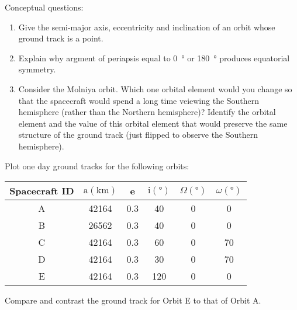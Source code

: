 \begin{hwkProblem}{1}{}

	Conceptual questions:
	\begin{enumerate}
		\item Give the semi-major axis, eccentricity and inclination of an orbit whose ground track is a point.
		\item Explain why argment of periapsis equal to \qty{0}{\degree} or \qty{180}{\degree} produces equatorial symmetry.
		\item Consider the Molniya orbit. Which one orbital element would you change so that the spacecraft would spend a long time veiewing the Southern hemisphere (rather than the Northern hemisphere)? Identify the orbital element and the value of this orbital element that would preserve the same structure of the ground track (just flipped to observe the Southern hemisphere).
	\end{enumerate}

	\hwkSol

\end{hwkProblem}
\begin{hwkProblem}{2}{}

	Plot one day ground tracks for the following orbits:
	\begin{center}
		\begin{tabular}{cccccc}
			\hline Spacecraft ID & \( \mathrm{a}(\unit{\km}) \) & e   & \( \mathrm{i}(\unit{\degree}) \) & \( \Omega(\unit{\degree}) \) & \( \omega(\unit{\degree}) \) \\
			\hline
			A                    & 42164                        & 0.3 & 40                               & 0                            & 0                            \\
			B                    & 26562                        & 0.3 & 40                               & 0                            & 0                            \\
			C                    & 42164                        & 0.3 & 60                               & 0                            & 70                           \\
			D                    & 42164                        & 0.3 & 30                               & 0                            & 70                           \\
			E                    & 42164                        & 0.3 & 120                              & 0                            & 0                            \\
			\hline
		\end{tabular}
	\end{center}
	Compare and contrast the ground track for Orbit E to that of Orbit A.

	\hwkSol

\end{hwkProblem}
